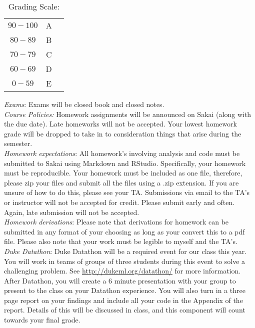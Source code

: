 \documentclass[11pt]{article}
\begin{document}
\begin{table}[ht]
\caption{Grading Scale:}
\begin{center}
\begin{tabular}{ccc}
$90-100$ &A\\
$80-89$ & B\\
$70-79$ & C\\
$60-69$ & D\\
$0-59$ &  E\\
\end{tabular}
\end{center}
\label{default}
\end{table}%

\emph{Exams}: Exams will be closed book and closed notes.\\

\emph{Course Policies:} 
Homework assignments will be announced on Sakai (along with the due date). Late homeworks will not be accepted. Your lowest homework grade will be dropped to take in to consideration things that arise during the semester. \\

\emph{Homework expectations}: All homework's involving analysis and code must be submitted to Sakai using Markdown and RStudio. Specifically, your homework must be reproducible. Your homework must be included as one file, therefore, please zip your files and submit all the files using a .zip extension. If you are unsure of how to do this, please see your TA. Submissions via email to the TA's or instructor will not be accepted for credit. Please submit early and often. Again, late submission will not be accepted. \\

\emph{Homework derivations}: Please note that derivations for homework can be submitted in any format of your choosing as long as your convert this to a pdf file. Please also note that your work must be legible to myself and the TA's. \\

\emph{Duke Datathon}: Duke Datathon will be a required event for our class this year. You will work in teams of groups of three students during this event to solve a challenging problem. See \url{http://dukeml.org/datathon/} for more information. After Datathon, you will create a 6 minute presentation with your group to present to the class on your Datathon experience. You will also turn in a three page report on your findings and include all your code in the Appendix of the report. Details of this will be discussed in class, and this component will count towards your final grade. \\
\end{document}
